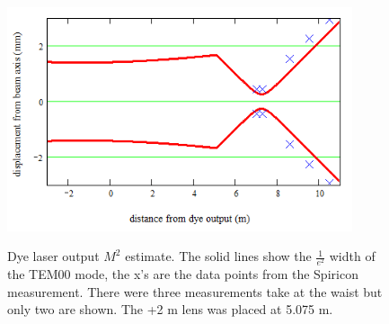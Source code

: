 \begin{figure}
\centering
\includegraphics[width=4.00in]
{M_squared/M_squared.png}\\
\caption[Dye laser output $M^2$ estimate]{Dye laser output $M^2$ estimate. The solid lines show the $\frac{1}{e^2}$ width of the TEM00 mode, the x's are the data points from the Spiricon measurement. There were three measurements take at the waist but only two are shown. The +2 m lens was placed at 5.075 m.}
\label{M_squared}
\end{figure} 
